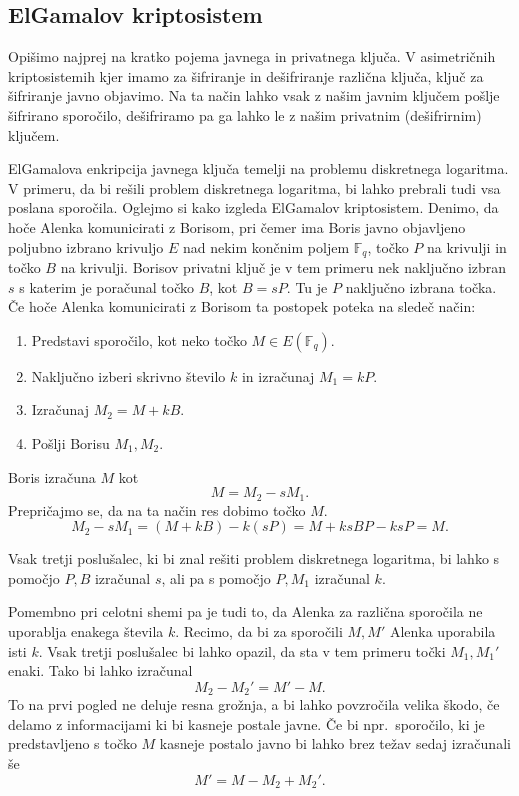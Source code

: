 \documentclass[12pt,a4paper,twoside]{article}
\theoremstyle{definition} %
\theoremstyle{plain} %
\numberwithin{equation}{section}  %
\newcommand{\F}{\mathbb F}
\newcommand{\E}[1]{E({#1})}
\begin{document}
\subsection{ElGamalov kriptosistem}
Opišimo najprej na kratko pojema javnega in privatnega ključa. V asimetričnih kriptosistemih kjer imamo za šifriranje in dešifriranje različna ključa, ključ za šifriranje javno objavimo. Na ta način lahko vsak z našim javnim ključem pošlje šifrirano sporočilo, dešifriramo pa ga lahko le z našim privatnim (dešifrirnim) ključem.

ElGamalova enkripcija javnega ključa temelji na problemu diskretnega logaritma. V primeru, da bi rešili problem diskretnega logaritma, bi lahko prebrali tudi vsa poslana sporočila.  Oglejmo si kako izgleda ElGamalov kriptosistem. Denimo, da hoče Alenka komunicirati z Borisom, pri čemer ima Boris javno objavljeno poljubno izbrano krivuljo $E$ nad nekim končnim poljem $\F_q$, točko $P$ na krivulji in točko $B$ na krivulji. Borisov privatni ključ je v tem primeru nek naključno izbran $s$ s katerim je poračunal točko $B$, kot $B = sP$. Tu je $P$ naključno izbrana točka. Če hoče Alenka komunicirati z Borisom ta postopek poteka na sledeč način:
\begin{enumerate}
\item Predstavi sporočilo, kot neko točko $M\in \E{\F_q}$.
\item Naključno izberi skrivno število $k$ in izračunaj $M_1 = kP$.
\item Izračunaj $M_2 = M+kB$.
\item Pošlji Borisu $M_1,M_2$.
\end{enumerate}

Boris izračuna $M$ kot
$$M = M_2-sM_1.$$
Prepričajmo se, da na ta način res dobimo točko $M$.
$$M_2-sM_1 = (M+kB)-k(sP)=M+ksBP-ksP = M.$$

Vsak tretji poslušalec, ki bi znal rešiti problem diskretnega logaritma, bi lahko s pomočjo $P,B$ izračunal $s$, ali pa s pomočjo $P,M_1$ izračunal $k$.

Pomembno pri celotni shemi pa je tudi to, da Alenka za različna sporočila ne uporablja enakega števila $k$. Recimo, da bi za sporočili $M,M'$ Alenka uporabila isti $k$. Vsak tretji poslušalec bi lahko opazil, da sta v tem primeru točki $M_1,M_1'$ enaki. Tako bi lahko izračunal
$$M_2-M_2' = M'-M.$$
To na prvi pogled ne deluje resna grožnja, a bi lahko povzročila velika škodo, če delamo z informacijami ki bi kasneje postale javne. Če bi npr.\ sporočilo, ki je predstavljeno s točko $M$ kasneje postalo javno bi lahko brez težav sedaj izračunali še
$$M' = M-M_2+M_2'.$$
\end{document}
